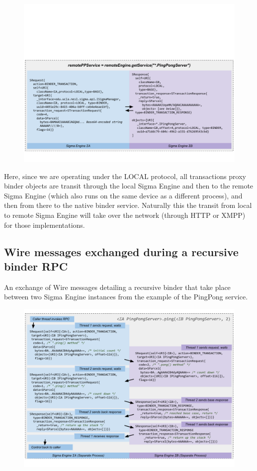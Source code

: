 \documentclass[prodmode]{acmlarge}
\begin{document}
\begin{figure}[h!]
\centering
\includegraphics[width=\textwidth]{drawings/WireExchange2.pdf}
\end{figure}

Here, since we are operating under the LOCAL protocol, all transactions proxy binder objects are transit through the local Sigma Engine and then to the remote Sigma Engine (which also runs on the same device as a different process), and then from there to the native binder service. Naturally this the transit from local to remote Sigma Engine will take over the network (through HTTP or XMPP) for those implementations.

\subsection{Wire messages exchanged during a recursive binder RPC}
\label{app:WireExchangeRecursive}
An exchange of Wire messages detailing a recursive binder that take place between two Sigma Engine instances from the example of the PingPong service.
\begin{figure}[h!]
\centering
\includegraphics[width=\textwidth]{drawings/WireExchangeRecursive.pdf}
\end{figure}
\end{document}
